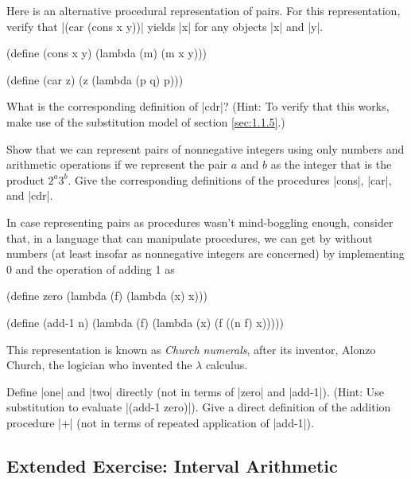 \begin{Exercise}
\label{exc:2.4}
Here is an alternative procedural representation of pairs.  For this
representation, verify that \scheme|(car (cons x y))| yields \scheme|x| for
any objects \scheme|x| and \scheme|y|.

\begin{schemedisplay}
(define (cons x y)
  (lambda (m) (m x y)))

(define (car z)
  (z (lambda (p q) p)))
\end{schemedisplay}
What is the corresponding definition of \scheme|cdr|? (Hint: To verify
that this works, make use of the substitution model of
section \ref{sec:1.1.5}.)



\begin{Exercise}
\label{exc:2.5}
Show that we can represent pairs of nonnegative integers using only
numbers and arithmetic operations if we represent the pair $a$ and $b$
as the integer that is the product $2^a3^b$.  Give the corresponding
definitions of the procedures \scheme|cons|, \scheme|car|, and
\scheme|cdr|.
\end{Exercise}

\begin{Exercise}
\label{exc:2.6}
In case representing pairs as procedures wasn't mind-boggling enough,
consider that, in a language that can manipulate procedures, we can
get by without numbers (at least insofar as nonnegative integers are
concerned) by implementing 0 and the operation of adding 1 as

\begin{schemedisplay}
(define zero (lambda (f) (lambda (x) x)))

(define (add-1 n)
  (lambda (f) (lambda (x) (f ((n f) x)))))
\end{schemedisplay}
This representation is known as \textit{Church numerals}, after its
inventor, Alonzo Church, the logician who invented the $\lambda$
calculus.

Define \scheme|one| and \scheme|two| directly (not in terms of \scheme|zero|
and \scheme|add-1|).  (Hint: Use substitution to evaluate \scheme|(add-1 zero)|).
Give a direct definition of the addition procedure \scheme|+| (not in
terms of repeated application of \scheme|add-1|).
\end{Exercise}


\subsection{Extended Exercise: Interval Arithmetic}
\label{sec:2.1.4}



\end{Exercise}
